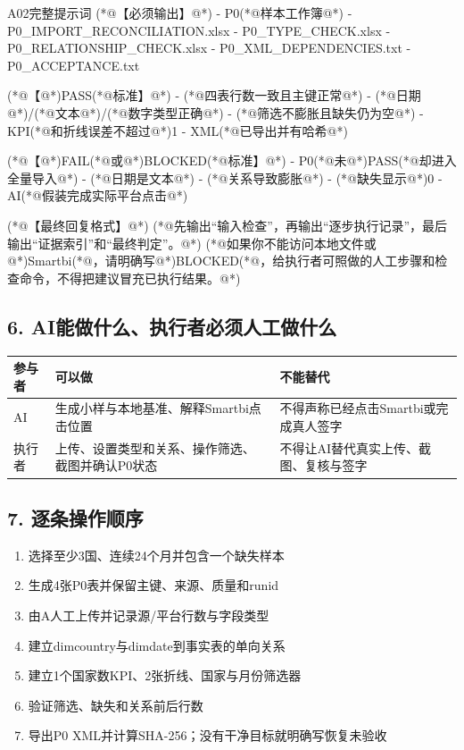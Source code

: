 \documentclass[UTF8,openany,zihao=-4]{ctexbook}
\renewcommand{\_}{\textunderscore\allowbreak}
\begin{document}
\begin{PromptBox}{A02完整提示词}
(*@{\promptcjk 【必须输出】}@*)
- P0(*@{\promptcjk 样本工作簿}@*)
- P0_IMPORT_RECONCILIATION.xlsx
- P0_TYPE_CHECK.xlsx
- P0_RELATIONSHIP_CHECK.xlsx
- P0_XML_DEPENDENCIES.txt
- P0_ACCEPTANCE.txt

(*@{\promptcjk 【}@*)PASS(*@{\promptcjk 标准】}@*)
- (*@{\promptcjk 四表行数一致且主键正常}@*)
- (*@{\promptcjk 日期}@*)/(*@{\promptcjk 文本}@*)/(*@{\promptcjk 数字类型正确}@*)
- (*@{\promptcjk 筛选不膨胀且缺失仍为空}@*)
- KPI(*@{\promptcjk 和折线误差不超过}@*)1%
- XML(*@{\promptcjk 已导出并有哈希}@*)

(*@{\promptcjk 【}@*)FAIL(*@{\promptcjk 或}@*)BLOCKED(*@{\promptcjk 标准】}@*)
- P0(*@{\promptcjk 未}@*)PASS(*@{\promptcjk 却进入全量导入}@*)
- (*@{\promptcjk 日期是文本}@*)
- (*@{\promptcjk 关系导致膨胀}@*)
- (*@{\promptcjk 缺失显示}@*)0
- AI(*@{\promptcjk 假装完成实际平台点击}@*)

(*@{\promptcjk 【最终回复格式】}@*)
(*@{\promptcjk 先输出“输入检查”，再输出“逐步执行记录”，最后输出“证据索引”和“最终判定”。}@*)
(*@{\promptcjk 如果你不能访问本地文件或}@*)Smartbi(*@{\promptcjk ，请明确写}@*)BLOCKED(*@{\promptcjk ，给执行者可照做的人工步骤和检查命令，不得把建议冒充已执行结果。}@*)
\end{PromptBox}

\subsection*{6. AI能做什么、执行者必须人工做什么}
\noindent\begin{tabularx}{\textwidth}{@{}p{}XX@{}}
\toprule
\textbf{参与者} & \textbf{可以做} & \textbf{不能替代} \\
\midrule
AI & 生成小样与本地基准、解释Smartbi点击位置 & 不得声称已经点击Smartbi或完成真人签字 \\
执行者 & 上传、设置类型和关系、操作筛选、截图并确认P0状态 & 不得让AI替代真实上传、截图、复核与签字 \\
\bottomrule
\end{tabularx}

\subsection*{7. 逐条操作顺序}
\begin{enumerate}
\item 选择至少3国、连续24个月并包含一个缺失样本
\item 生成4张P0表并保留主键、来源、质量和run\_id
\item 由A人工上传并记录源/平台行数与字段类型
\item 建立dim\_country与dim\_date到事实表的单向关系
\item 建立1个国家数KPI、2张折线、国家与月份筛选器
\item 验证筛选、缺失和关系前后行数
\item 导出P0 XML并计算SHA-256；没有干净目标就明确写恢复未验收
\end{enumerate}
\end{document}
